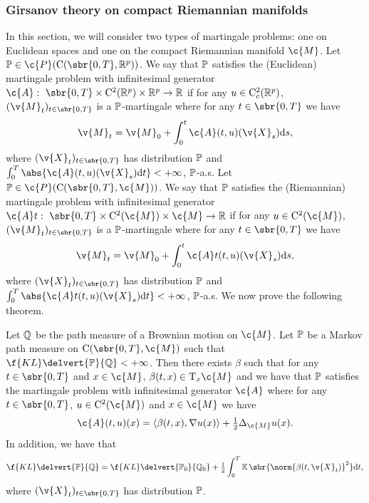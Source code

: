 \subsubsection{Girsanov theory on compact Riemannian manifolds}
\label{sec:girs-theory-comp}

In this section, we will consider two types of martingale problems: one on Euclidean spaces and one on the compact Riemannian manifold \(\c{M}\).
Let \(\bb{P} \in \c{P}(\mathrm{C}(\sbr{0,T}, \R^p))\).
We say that \(\bb{P}\) satisfies the (Euclidean) martingale problem with infinitesimal generator \(\c{A}: \ \sbr{0,T} \times \mathrm{C}^2(\R^p) \times \R^p \to \R\) if for any \(u \in \mathrm{C}_c^2(\mathbb{R}^p)\), \((\v{M}_t)_{t \in \sbr{0,T}}\) is a \(\bb{P}\)-martingale where for any \(t \in \sbr{0,T}\) we have \begin{equation} { \v{M}_t = \v{M}_0 + \int_0^t \c{A}(t, u)(\v{X}_s) \mathrm{d} s , } \end{equation} where \((\v{X}_t)_{t \in \sbr{0,T}}\) has distribution \(\bb{P}\) and \(\int_0^T \abs{\c{A}(t, u)(\v{X}_s) \mathrm{d} t} <+\infty\), \(\bb{P}\)-a.s.
Let \(\bb{P} \in \c{P}(\mathrm{C}(\sbr{0,T}, \c{M}))\).
We say that \(\bb{P}\) satisfies the (Riemannian) martingale problem with infinitesimal generator \(\c{A}t: \ \sbr{0,T} \times \mathrm{C}^2(\c{M}) \times \c{M} \to \R\) if for any \(u \in \mathrm{C}^2(\c{M})\), \((\v{M}_t)_{t \in \sbr{0,T}}\) is a \(\bb{P}\)-martingale where for any \(t \in \sbr{0,T}\) we have \begin{equation} { \v{M}_t = \v{M}_0 + \int_0^t \c{A}t(t, u)(\v{X}_s) \mathrm{d} s , } \end{equation} where \((\v{X}_t)_{t \in \sbr{0,T}}\) has distribution \(\bb{P}\) and \(\int_0^T \abs{\c{A}t(t, u)(\v{X}_s) \mathrm{d} t} <+\infty\), \(\bb{P}\)-a.s.
We now prove the following theorem.

\begin{proposition}
	\label{prop:girsanov_manifold}
	Let \(\bb{Q}\) be the path measure of a Brownian motion on \(\c{M}\).
	Let \(\bb{P}\) be a Markov path measure on \(\mathrm{C}(\sbr{0,T}, \c{M})\) such that \(\f{KL}\delvert{\bb{P}}{\bb{Q}} < +\infty\).
	Then there exists \(\beta\) such that for any \(t \in \sbr{0,T}\) and \(x \in \c{M}\), \(\beta(t,x) \in \mathrm{T}_x \c{M}\) and we have that \(\bb{P}\) satisfies the martingale problem with infinitesimal generator \(\c{A}\) where for any \(t \in \sbr{0,T}\), \(u \in \mathrm{C}^2(\c{M})\) and \(x \in \c{M}\) we have \begin{equation} \c{A}(t,u)(x) = \langle \beta(t,x), \nabla u(x) \rangle + \tfrac{1}{2} \Delta_\c{M} u(x) .
	\end{equation}
	In addition, we have that \begin{equation} {\f{KL}\delvert{\bb{P}}{\bb{Q}} = \f{KL}\delvert{\bb{P}_0}{\bb{Q}_0} + \tfrac{1}{2} \int_0^T \E\sbr{\norm{\beta(t, \v{X}_t)}^2} \mathrm{d} t ,} \end{equation} where \((\v{X}_t)_{t \in \sbr{0,T}}\) has distribution \(\bb{P}\).
\end{proposition}

